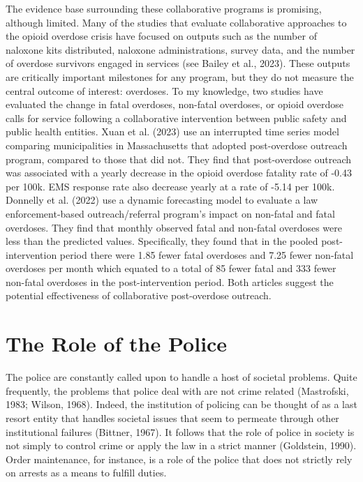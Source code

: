 The evidence base surrounding these collaborative programs is promising, although limited. Many of the studies that evaluate collaborative approaches to the opioid overdose crisis have focused on outputs such as the number of naloxone kits distributed, naloxone administrations, survey data, and the number of overdose survivors engaged in services (see Bailey et al., 2023). These outputs are critically important milestones for any program, but they do not measure the central outcome of interest: overdoses. To my knowledge, two studies have evaluated the change in fatal overdoses, non-fatal overdoses, or opioid overdose calls for service following a collaborative intervention between public safety and public health entities. Xuan et al. (2023) use an interrupted time series model comparing municipalities in Massachusetts that adopted post-overdose outreach program, compared to those that did not. They find that post-overdose outreach was associated with a yearly decrease in the opioid overdose fatality rate of -0.43 per 100k. EMS response rate also decrease yearly at a rate of -5.14 per 100k. Donnelly et al. (2022) use a dynamic forecasting model to evaluate a law enforcement-based outreach/referral program’s impact on non-fatal and fatal overdoses. They find that monthly observed fatal and non-fatal overdoses were less than the predicted values. Specifically, they found that in the pooled post-intervention period there were 1.85 fewer fatal overdoses and 7.25 fewer non-fatal overdoses per month which equated to a total of 85 fewer fatal and 333 fewer non-fatal overdoses in the post-intervention period. Both articles suggest the potential effectiveness of collaborative post-overdose outreach.

\section{The Role of the Police}

The police are constantly called upon to handle a host of societal problems. Quite frequently, the problems that police deal with are not crime related (Mastrofski, 1983; Wilson, 1968). Indeed, the institution of policing can be thought of as a last resort entity that handles societal issues that seem to permeate through other institutional failures (Bittner, 1967). It follows that the role of police in society is not simply to control crime or apply the law in a strict manner (Goldstein, 1990). Order maintenance, for instance, is a role of the police that does not strictly rely on arrests as a means to fulfill duties. 

